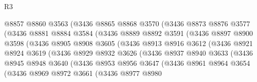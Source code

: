 \begin{lexlean}{R3}
\begin{coremodule}
                      @8857
                      @8860
                      @3563
                      (@3436
                        @8865
                        @8868
                        @3570
                        (@3436
                          @8873
                          @8876
                          @3577
                          (@3436
                            @8881
                            @8884
                            @3584
                            (@3436
                              @8889
                              @8892
                              @3591
                              (@3436
                                @8897
                                @8900
                                @3598
                                (@3436
                                  @8905
                                  @8908
                                  @3605
                                  (@3436
                                    @8913
                                    @8916
                                    @3612
                                    (@3436
                                      @8921
                                      @8924
                                      @3619
                                      (@3436
                                        @8929
                                        @8932
                                        @3626
                                        (@3436
                                          @8937
                                          @8940
                                          @3633
                                          (@3436
                                            @8945
                                            @8948
                                            @3640
                                            (@3436
                                              @8953
                                              @8956
                                              @3647
                                              (@3436
                                                @8961
                                                @8964
                                                @3654
                                                (@3436
                                                  @8969
                                                  @8972
                                                  @3661
                                                  (@3436
                                                    @8977
                                                    @8980

\end{coremodule}
\end{lexlean}
